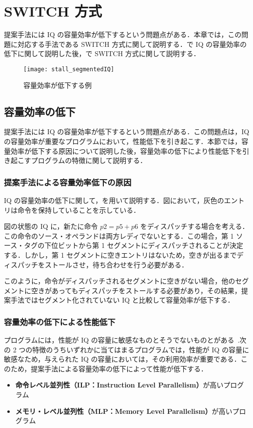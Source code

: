 \chapter{SWITCH 方式}
\label{sec:switch}
提案手法には IQ の容量効率が低下するという問題点がある．本章では，この問題に対応する手法である SWITCH  方式に関して説明する．で IQ の容量効率の低下に関して説明した後，で SWITCH 方式に関して説明する．

\begin{figure}[tb]
  \centering
  \texttt{[image: stall\_segmentedIQ]}
  \caption{容量効率が低下する例}
  \label{fig:stall_segmentedIQ}
\end{figure}


\section{容量効率の低下}
\label{sec:occupency_reduction}
提案手法には IQ の容量効率が低下するという問題点がある．この問題点は，IQ の容量効率が重要なプログラムにおいて，性能低下を引き起こす．本節では，容量効率が低下する原因について説明した後，容量効率の低下により性能低下を引き起こすプログラムの特徴に関して説明する．

\subsection{提案手法による容量効率低下の原因}
IQ の容量効率の低下に関して，を用いて説明する．図において，灰色のエントリは命令を保持していることを示している．

図の状態の IQ に，新たに命令 $p2 = p5 + p6$ をディスパッチする場合を考える．この命令のソース・オペランドは両方レディでないとする．この場合，第 1 ソース・タグの下位ビットから第 1 セグメントにディスパッチされることが決定する．しかし，第 1 セグメントに空きエントリはないため，空きが出るまでディスパッチをストールさせ，待ち合わせを行う必要がある．

このように，命令がディスパッチされるセグメントに空きがない場合，他のセグメントに空きがあってもディスパッチをストールする必要があり，その結果，提案手法ではセグメント化されていない IQ と比較して容量効率が低下する．

\subsection{容量効率の低下による性能低下}
プログラムには，性能が IQ の容量に敏感なものとそうでないものとがある~\cite{Ando2019, Kora2013, Sembrant2015}.次の 2 つの特徴のうちいずれかに当てはまるプログラムでは，性能が IQ の容量に敏感なため，与えられた IQ の容量においては，その利用効率が重要である．このため，提案手法による容量効率の低下によって性能が低下する．
\begin{itemize}
  \item \textbf{命令レベル並列性（ILP：Instruction Level Parallelism）}が高いプログラム
  \item \textbf{メモリ・レベル並列性（MLP：Memory Level Parallelism）}が高いプログラム 
\end{itemize}

